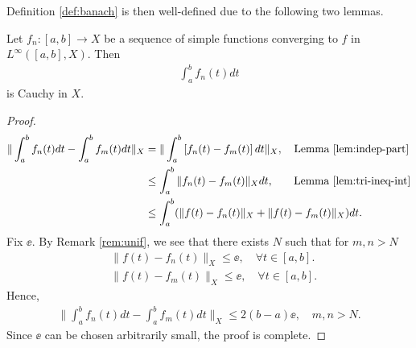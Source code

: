 %
%
%
%
%
%
%
%
%
Definition \ref{def:banach} is then well-defined due to the following two
lemmas.
%
%
%
%
%
%
%
%
%
%
\begin{lemma}[Convergence] Let $f_{n}: [a,b] \to X$ be a sequence of simple
  functions converging to $f$ in $L^{\infty}([a,b], X)$. Then
  \begin{equation*}
  \begin{split}
    \int_{a}^{b}f_{n}(t) dt
  \end{split}
  \end{equation*}
  is Cauchy in $X$. 
\label{lem:conv}
\end{lemma}
%
%
%
%
\begin{proof}
  \begin{equation}
    \begin{split}
  \| \int_{a}^{b} f_{n}(t) dt - \int_{a}^{b} f_{m}(t) dt \|_{X}
  & = \| \int_{a}^{b}\left[ f_{n}(t) - f_{m}(t) \right]dt \|_{X}, \quad \text{Lemma
  \ref{lem:indep-part}}
  \\
  & \le \int_{a}^{b} \| f_{n}(t) - f_{m}(t) \|_{X} dt,
  \quad \phantom{m} \text{Lemma \ref{lem:tri-ineq-int}}
  \\
  & \le \int_{a}^{b} (\| f(t) - f_{n}(t) \|_{X} + \| f(t) - f_{m}(t) \|_{X})dt.
\end{split}
\end{equation}
%
Fix $\ee$. By Remark \ref{rem:unif}, we see that there exists $N$ such
that for $m, n > N$
%
%
\begin{equation*}
\begin{split}
& \| f(t) - f_{n}(t) \|_{X} \le \ee, \quad \forall t \in [a, b].
\\
& \| f(t) - f_{m}(t) \|_{X} \le \ee, \quad \forall t \in [a, b].
\end{split}
\end{equation*}
Hence,
%
%
\begin{equation*}
\begin{split}
\| \int_{a}^{b} f_{n}(t) dt - \int_{a}^{b} f_{m}(t) dt \|_{X} \le 2(b-a) \ee,
\quad m,n > N.
\end{split}
\end{equation*}
%
Since $\ee$ can be chosen arbitrarily small, the proof is complete.
\end{proof}
